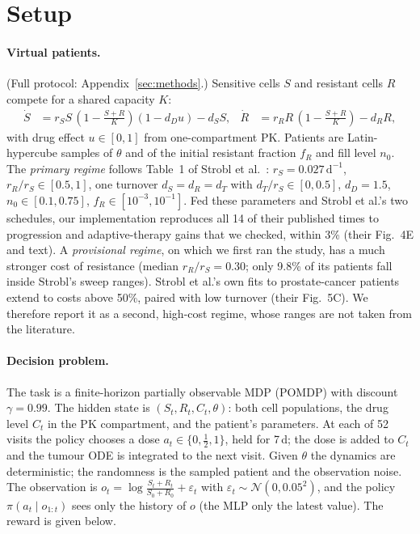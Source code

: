 \documentclass[10pt]{article}
\begin{document}
\section{Setup}\label{sec:setup}
\paragraph{Virtual patients.} (Full protocol: Appendix~\ref{sec:methods}.) Sensitive cells $S$ and resistant cells $R$
compete for a shared capacity $K$:
\begin{align*}
\dot S &= r_S S\,(1 - \tfrac{S+R}{K})(1 - d_D u) - d_S S, &
\dot R &= r_R R\,(1 - \tfrac{S+R}{K}) - d_R R,
\end{align*}
with drug effect $u\in[0,1]$ from one-compartment PK. Patients are
Latin-hypercube samples of $\theta$ and of the initial resistant fraction $f_R$
and fill level $n_0$. The \emph{primary regime} follows Table~1 of Strobl et
al.\ \citeyearpar{strobl2021}: $r_S = 0.027\,\mathrm{d}^{-1}$, $r_R/r_S \in [0.5, 1]$,
one turnover $d_S=d_R=d_T$ with $d_T/r_S\in[0,0.5]$, $d_D=1.5$,
$n_0\in[0.1,0.75]$, $f_R\in[10^{-3},10^{-1}]$. Fed these parameters and
Strobl et al.'s two schedules, our implementation reproduces all 14 of their
published times to progression and adaptive-therapy gains that we checked,
within 3\% (their Fig.~4E and text).
A \emph{provisional regime}, on
which we first ran the study, has a much stronger cost of resistance (median
$r_R/r_S = 0.30$; only 9.8\% of its patients fall inside Strobl's sweep
ranges). Strobl et al.'s own fits to prostate-cancer patients extend to costs
above 50\%, paired with low turnover (their Fig.~5C). We therefore report it as
a second, high-cost regime, whose ranges are not taken from the literature.

\paragraph{Decision problem.} The task is a finite-horizon partially observable MDP (POMDP) with discount $\gamma=0.99$. The hidden state is $(S_t,R_t,C_t,\theta)$: both cell populations, the drug level $C_t$ in the PK compartment, and the patient's parameters. At each of 52 visits the policy chooses a dose $a_t\in\{0,\tfrac12,1\}$, held for 7\,d; the dose is added to $C_t$ and the tumour ODE is integrated to the next visit. Given $\theta$ the dynamics are deterministic; the randomness is the sampled patient and the observation noise. The observation is $o_t=\log\frac{S_t+R_t}{S_0+R_0}+\varepsilon_t$ with $\varepsilon_t\sim\mathcal{N}(0,0.05^2)$, and the policy $\pi(a_t\mid o_{1:t})$ sees only the history of $o$ (the MLP only the latest value). The reward is given below.
\end{document}
